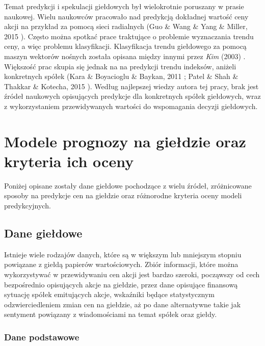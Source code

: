 \documentclass[a4paper, twoside, 11pt, openright]{article}
\begin{document}
\bigskip

Temat predykcji i spekulacji giełdowych był wielokrotnie poruszany w prasie naukowej. Wielu naukowców pracowało nad predykcją dokładnej wartość ceny akcji na przykład za pomocą sieci radialnych (Guo \& Wang \& Yang \& Miller, 2015 \cite{paper_regression_radial}). Często można spotkać prace traktujące o problemie wyznaczania trendu ceny, a więc problemu klasyfikacji. Klasyfikacja trendu giełdowego za pomocą maszyn wektorów nośnych została opisana między innymi przez \textit{Kim} (2003) \cite{paper_classification_svm}. Większość prac skupia się jednak na na predykcji trendu indeksów, aniżeli konkretnych spółek (Kara \& Boyacioglu \& Baykan, 2011 \cite{paper_classification_index_istanbul}; Patel \& Shah \& Thakkar \& Kotecha, 2015 \cite{paper_classification_index_sp500}). Według najlepszej wiedzy autora tej pracy, brak jest źródeł naukowych opisujących predykcje dla konkretnych spółek giełdowych, wraz z wykorzystaniem przewidywanych wartości do wspomagania decyzji giełdowych. 

\newpage

\section{Modele prognozy na giełdzie oraz kryteria ich oceny}

Poniżej opisane zostały dane giełdowe pochodzące z wielu źródeł, zróżnicowane sposoby na predykcje cen na giełdzie oraz różnorodne kryteria oceny modeli predykcyjnych. 

\subsection{Dane giełdowe}

Istnieje wiele rodzajów danych, które są w większym lub mniejszym stopniu powiązane z giełdą papierów wartościowych. Zbiór informacji, które można wykorzystywać w przewidywaniu cen akcji jest bardzo szeroki, począwszy od cech bezpośrednio opisujących akcje na giełdzie, przez dane opisujące finansową sytuację spółek emitujących akcje, wskaźniki będące statystycznym odzwierciedleniem zmian cen na giełdzie, aż po dane alternatywne takie jak sentyment powiązany z wiadomościami na temat spółek oraz giełdy.

\subsubsection{Dane podstawowe}
\end{document}

